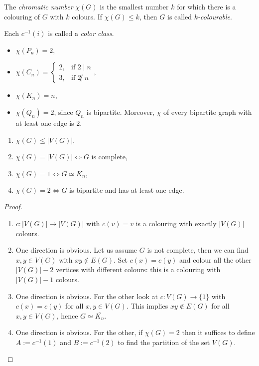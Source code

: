 \begin{definition} The \emph{chromatic number} $\chi(G)$ is the smallest number $k$ for which there is a colouring of $G$ with $k$ colours. If $\chi(G)\leqslant k$, then $G$ is called \emph{$k$-colourable}.
\end{definition}

\begin{definition} Each $c^{-1}(i)$ is called a \emph{color class}.
\end{definition}

\begin{example}
\begin{itemize}
\item $\chi(P_n)=2$,
\item $\chi(C_n)=
\begin{cases} 
2, & \text{if } 2\mid n\\ 
3, & \text{if } 2\not| \ n
\end{cases},$
\item $\chi(K_n)=n$,
\item $\chi(Q_n)=2$, since $Q_n$ is bipartite. Moreover, $\chi$ of every bipartite graph with at least one edge is $2$.
\end{itemize}
\end{example}

\begin{lemma}
\begin{enumerate}
\item $\chi(G)\leqslant |V(G)|$,
\item $\chi(G)=|V(G)| \Longleftrightarrow G$ is complete,
\item $\chi(G)=1 \Longleftrightarrow G \simeq \overline{K_n},$
\item $\chi(G)=2 \Longleftrightarrow G$ is bipartite and has at least one edge.
\end{enumerate}
\end{lemma}

\begin{proof}
\begin{enumerate}
\item $c: |V(G)| \longrightarrow  |V(G)|$ with $c(v)=v$ is a colouring with exactly $|V(G)|$ colours.
\item One direction is obvious. Let us assume $G$ is not complete, then we can find $x,y\in V(G)$ with $xy\notin E(G)$. Set $c(x)=c(y)$ and colour all the other $|V(G)|-2$ vertices with different colours: this is a colouring with $|V(G)|-1$ colours.
\item One direction is obvious. For the other look at $c:V(G)\longrightarrow \{1\}$ with $c(x)=c(y)$ for all $x,y\in V(G)$. This implies $xy\notin E(G)$ for all $x,y\in V(G)$, hence $G \simeq \overline{K_n}$.
\item One direction is obvious. For the other, if $\chi(G)=2$ then it suffices to define $A:=c^{-1}(1)$ and $B:=c^{-1}(2)$ to find the partition of the set $V(G)$.
\end{enumerate}
\end{proof}

